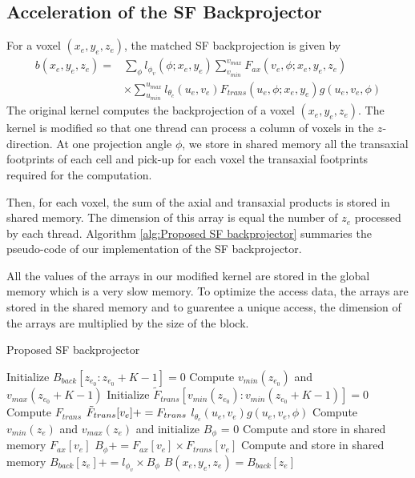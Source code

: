 \documentclass[12pt]{spieman}  %
\begin{document}
\begin{spacing}{1}

\subsection{Acceleration of the SF Backprojector}
For a voxel $(x_e,y_e,z_e)$, the matched SF backprojection is given by\cite{long20103d}
\begin{align}
    b(x_e,y_e,z_e) = & \sum_{\phi} l_{\phi_{v}}(\phi; x_e,y_e) \sum_{v_{min}}^{v_{max}} F_{ax}(v_e, \phi ; x_e,y_e,z_e)   \\
    & \times  \sum_{u_{min}}^{u_{max}} l_{\theta_{c}}(u_e,v_e) F_{trans}(u_e, \phi; x_e,y_e) g(u_e,v_e, \phi) \nonumber
\end{align}
The original kernel\cite{chapdelaine2018new} computes the backprojection of a voxel  $(x_e,y_e,z_e)$. The kernel is modified so that one thread can process a column of voxels in the $z$-direction.  At one projection angle $\phi$, we store in shared memory all the transaxial footprints of each cell and pick-up for each voxel the transaxial footprints required  for the computation.

Then, for each voxel, the sum of the axial and transaxial products is stored in shared memory. The dimension of this array is equal the number of $z_e$ processed by each thread.
Algorithm \ref{alg:Proposed SF backprojector} summaries the pseudo-code of our implementation of the SF backprojector.

All the values of the arrays in our modified kernel are stored in the global memory which is a very slow memory. To optimize the access data, the arrays are stored in the shared memory and to guarentee a unique access, the dimension of the arrays are multiplied by the size of the block.


\begin{algorithm}
\caption{Proposed SF backprojector}
\label{alg:Proposed SF backprojector}
\begin{algorithmic}

\STATE Initialize $B_{back}[z_{e_0} : z_{e_0} + K -1]=0$
 \STATE Compute $v_{min}(z_{e_0})$ and $v_{max}(z_{e_0} + K - 1) $
 \STATE Initialize $\tilde{F}_{trans}[v_{min}(z_{e_0}): v_{min}(z_{e_0}+K-1)] =0$
   \STATE Compute $F_{trans}$
      \STATE $\Tilde{F}_{trans}[v_{e}]  += F_{trans}$  $l_{\theta_{c}}(u_e,v_e) g(u_e,v_e,\phi)$
   \ENDFOR
 \ENDFOR
 \STATE Compute $v_{min}(z_e)$ and $v_{max}(z_e)$ and initialize $B_{\phi}$ = 0
        \STATE Compute and store in shared memory $F_{ax}[v_e]$
		\STATE $B_{\phi} += F_{ax}[v_e] \times F_{trans}[v_e]$ 
 \ENDFOR
 \STATE Compute and store in shared memory $B_{back}[z_e] += l_{\phi_{v}} \times B_{\phi}$ 
  \ENDFOR
 \STATE $B(x_e,y_e,z_e) = B_{back}[z_e]$
 \ENDFOR
 \ENDFOR 


\end{algorithmic}
\end{algorithm}
\end{spacing}
\end{document}
